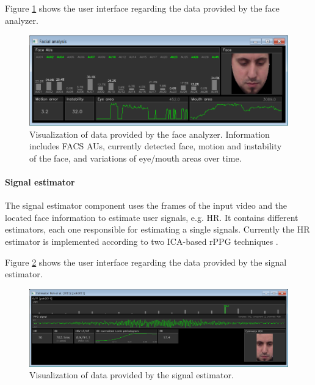 Figure \ref{fig:tool-ui-face-analyzer} shows the user interface regarding the data provided by the face analyzer.

\begin{figure}[h]
    \centering
    \includegraphics[width=\textwidth]{figures/tool-ui-face-analyzer.png}
    \caption{Visualization of data provided by the face analyzer. Information includes FACS AUs, currently detected face, motion and instability of the face, and variations of eye/mouth areas over time.}
    \label{fig:tool-ui-face-analyzer}
\end{figure}

\paragraph{Signal estimator}

The signal estimator component uses the frames of the input video and the located face information to estimate user signals, e.g. HR. It contains different estimators, each one responsible for estimating a single signals. Currently the HR estimator is implemented according to two ICA-based rPPG techniques \parencite{poh2010non,poh2011advancements}.

Figure \ref{fig:tool-ui-signal-estimator} shows the user interface regarding the data provided by the signal estimator.

\begin{figure}[h]
    \centering
    \includegraphics[width=\textwidth]{figures/tool-ui-signal-estimator.png}
    \caption{Visualization of data provided by the signal estimator.}
    \label{fig:tool-ui-signal-estimator}
\end{figure}

